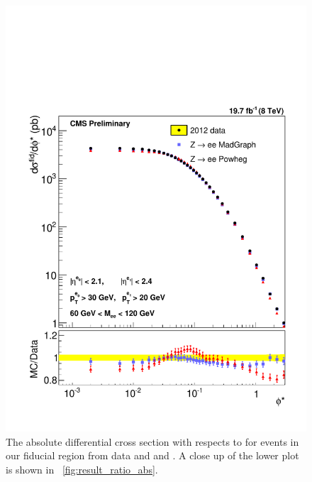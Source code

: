 \begin{figure}[!htbp]
    \centering
    \includegraphics[width=\textwidth]{figures/ZShape_elec_Abs_Dressed.pdf}
    \caption[
        The absolute differential cross section with respects to \phistar for
        \Ztoee events in our fiducial region from data and \MADGRAPH and
        \POWHEG.
    ]{
        The absolute differential cross section with respects to \phistar for
        \Ztoee events in our fiducial region from data and \MADGRAPH and
        \POWHEG. A close up of the lower plot is shown in
        \FIG~\ref{fig:result_ratio_abs}.
    }
    \label{fig:result_abs}
\end{figure}


